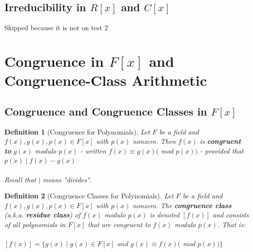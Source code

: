 \documentclass{article}
\theoremstyle{break}
\newtheorem{definition}{Definition}[subsection]
\begin{document}
\subsection{Irreducibility in $R[x]$ and $C[x]$}
Skipped because it is not on test 2

\section{Congruence in $F[x]$ and Congruence-Class Arithmetic}

\subsection{Congruence and Congruence Classes in $F[x]$}

\begin{definition}[Congruence for Polynomials]
  Let $F$ be a field and $f(x), g(x), p(x) \in F[x]$ with $p(x)$ nonzero. Then
  $f(x)$ is \textbf{congruent to} $g(x)$ modulo $p(x)$ - written $f(x) \equiv
  g(x)($ mod $p(x))$ - provided that $p(x) \mid f(x) - g(x)$
  \\ \\ Recall that $\mid$ means "divides".
\end{definition}

\begin{definition}[Congruence Classes for Polynomials]
  Let $F$ be a field and $f(x), g(x), p(x) \in F[x]$ with $p(x)$ nonzero. The
  \textbf{congruence class} (a.k.a. \textbf{residue class}) of $f(x)$ modulo
  $p(x)$ is denoted $[f(x)]$ and consists of all polynomials in $F[x]$ that are
  congruent to $f(x)$ modulo $p(x)$. That is:
  \\ \\ $[f(x)] = \{ g(x) \mid g(x) \in F[x] $ and $ g(x) \equiv f(x) ($ mod
  $p(x)) \}$
\end{definition}

\end{document}
